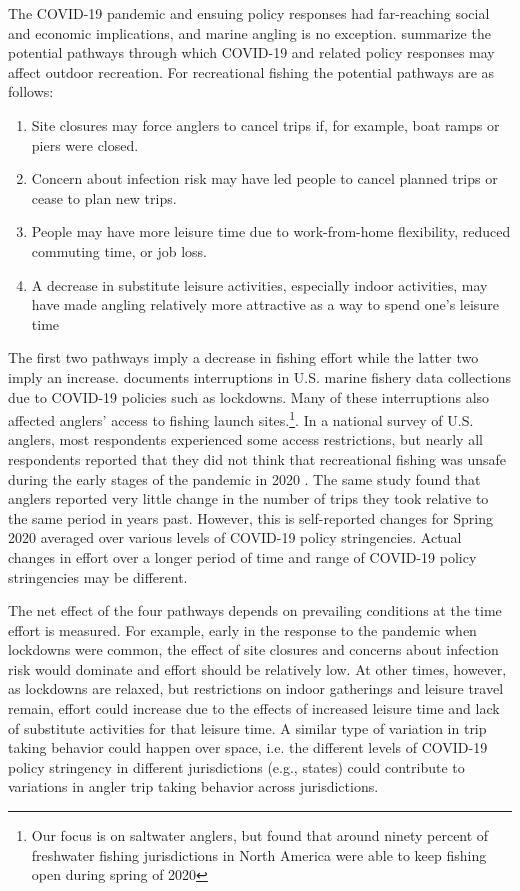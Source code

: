 \documentclass[12pt]{article}
\begin{document}
The COVID-19 pandemic and ensuing policy responses had far-reaching social and economic implications, and marine angling is no exception. \citet{landry2021has} summarize the potential pathways through which COVID-19 and related policy responses may affect outdoor recreation. For recreational fishing the potential pathways are as follows:

\begin{enumerate}
\def\labelenumi{\arabic{enumi}.}
\item
  Site closures may force anglers to cancel trips if, for example, boat
  ramps or piers were closed.
\item
  Concern about infection risk may have led people to cancel planned
  trips or cease to plan new trips.
\item
  People may have more leisure time due to work-from-home flexibility,
  reduced commuting time, or job loss.
\item
  A decrease in substitute leisure activities, especially indoor
  activities, may have made angling relatively more attractive as a way
  to spend one's leisure time \citep{midway2021covid,morales2021contrasting}
\end{enumerate}

The first two pathways imply a decrease in fishing effort while the latter two imply an increase. \citet{link2021noaa} documents interruptions in U.S. marine fishery data collections due to COVID-19 policies such as lockdowns. Many of these interruptions also affected anglers' access to fishing launch sites.\footnote{Our focus is on saltwater anglers, but \citet{paradis2021can} found that around ninety percent of freshwater fishing jurisdictions in North America were able to keep fishing open during spring of 2020}. In a national survey of U.S. anglers, most respondents experienced some access restrictions, but nearly all respondents reported that they did not think that recreational fishing was unsafe during the early stages of the pandemic in 2020 \citep{midway2021covid}. The same study found that anglers reported very little change in the number of trips they took relative to the same period in years past. However, this is self-reported changes for Spring 2020 averaged over various levels of COVID-19 policy stringencies.  Actual changes in effort over a longer period of time and range of COVID-19 policy stringencies may be different. 

The net effect of the four pathways depends on prevailing conditions at the time effort is measured. For example, early in the response to the pandemic when lockdowns were common, the effect of site closures and concerns about infection risk would dominate and effort should be relatively low. At other times, however, as lockdowns are relaxed, but restrictions on indoor gatherings and leisure travel remain, effort could increase due to the effects of increased leisure time and lack of substitute activities for that leisure time. A similar type of variation in trip taking behavior could happen over space, i.e. the different levels of COVID-19 policy stringency in different jurisdictions (e.g., states) could contribute to variations in angler trip taking behavior across jurisdictions.
\end{document}
